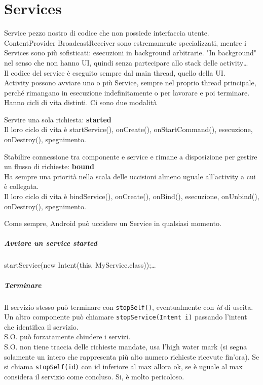 \documentclass[10pt]{book}
\begin{document}
\chapter{Services}
Service pezzo nostro di codice che non possiede interfaccia utente. ContentProvider BroadcastReceiver sono estremamente specializzati, mentre i Services sono più sofisticati: esecuzioni in background arbitrarie. "In background" nel senso che non hanno UI, quindi senza partecipare allo stack delle activity\ldots\\
Il codice del service è eseguito sempre dal main thread, quello della UI.\\
Activity possono avviare uno o più Service, sempre nel proprio thread principale, perché rimangano in esecuzione indefinitamente o per lavorare e poi terminare.\\
Hanno cicli di vita distinti. Ci sono due modalità
\begin{list}{}{}
	\item Servire una sola richiesta: \textbf{started}\\
	Il loro ciclo di vita è startService(), onCreate(), onStartCommand(), esecuzione, onDestroy(), spegnimento.
	\item Stabilire connessione tra componente e service e rimane a disposizione per gestire un flusso di richieste: \textbf{bound}\\
	Ha sempre una priorità nella scala delle uccisioni almeno uguale all'activity a cui è collegata.\\
	Il loro ciclo di vita è bindService(), onCreate(), onBind(), esecuzione, onUnbind(), onDestroy(), spegnimento.
\end{list}
Come sempre, Android può uccidere un Service in qualsiasi momento.
\paragraph{Avviare un service started} startService(new Intent(this, MyService.class));\ldots
\paragraph{Terminare} Il servizio stesso può terminare con \texttt{stopSelf()}, eventualmente con \textit{id} di uscita.\\
Un altro componente può chiamare \texttt{stopService(Intent i)} passando l'intent che identifica il servizio.\\
S.O. può forzatamente chiudere i servizi.\\
S.O. non tiene traccia delle richieste mandate, usa l'high water mark (si segna solamente un intero che rappresenta più alto numero richieste ricevute fin'ora). Se si chiama \texttt{stopSelf(id)} con id inferiore al max allora ok, se è uguale al max considera il servizio come concluso. Si, è molto pericoloso.
\end{document}
